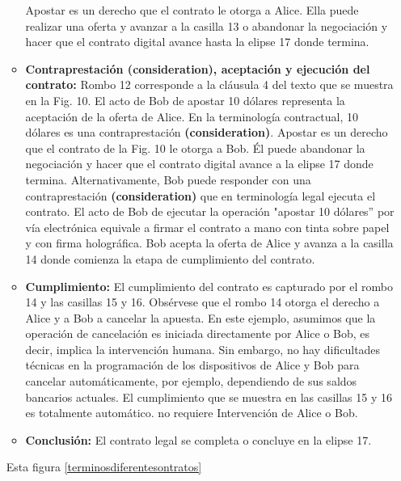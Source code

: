 \documentclass[12pt]{report} %
\begin{document}
\begin{itemize}
\begin{itemize}
  Apostar es un derecho que el contrato le otorga a Alice. Ella puede realizar una oferta y avanzar a la casilla 13 o abandonar la negociación y hacer que el contrato digital avance hasta la elipse 17 donde termina.


   \item \textbf{ Contraprestación (consideration), aceptación y ejecución del contrato:} Rombo 12 corresponde a la cláusula 4 del texto que se muestra en la Fig. 10. El acto de Bob de apostar 10 dólares representa la aceptación de la oferta de Alice. En la terminología contractual, 10 dólares es una contraprestación \textbf{(consideration)}. Apostar es un derecho que el contrato de la Fig. 10 le otorga a Bob. Él puede abandonar la negociación y hacer que el contrato digital avance a la elipse 17 donde termina. Alternativamente, Bob puede responder con una contraprestación \textbf{(consideration)} que en terminología legal ejecuta el contrato. El acto de Bob de ejecutar la operación "apostar 10 dólares” por vía electrónica equivale a firmar el contrato a mano con tinta sobre papel y con firma holográfica. Bob acepta la oferta de Alice y avanza a la casilla 14 donde comienza la etapa de cumplimiento del contrato.

  \item \textbf{ Cumplimiento:} El cumplimiento del contrato es capturado por el rombo 14 y las casillas 15 y 16. Obsérvese que el rombo 14 otorga el derecho a Alice y a Bob a cancelar la apuesta. En este ejemplo, asumimos que la operación de cancelación es iniciada directamente por Alice o Bob, es decir, implica la intervención humana. Sin embargo, no hay dificultades técnicas en la programación de los dispositivos de Alice y Bob para cancelar automáticamente, por ejemplo, dependiendo de sus saldos bancarios actuales. El cumplimiento que se muestra en las casillas 15 y 16 es totalmente automático. no requiere Intervención de Alice o Bob.

  \item \textbf{ Conclusión:} El contrato legal se completa o concluye en la elipse 17.

   
\end{itemize}



Esta figura \ref{terminosdiferentesontratos}



\end{itemize}
\end{document}
